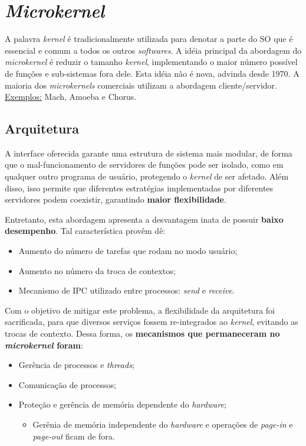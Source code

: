 \chapter{\textit{Microkernel}}
A palavra \textit{kernel} é tradicionalmente utilizada para denotar a parte do SO que é essencial e comum a todos os outros \textit{softwares}. A idéia principal da abordagem do \textit{microkernel} é reduzir o tamanho \textit{kernel}, implementando o maior número possível de funções e sub-sistemas fora dele. Esta idéia não é nova, advinda desde 1970. A maioria dos \textit{microkernels} comerciais utilizam a abordagem cliente/servidor. \underline{Exemplos:} Mach, Amoeba e Chorus.

\section{Arquitetura}
A interface oferecida garante uma estrutura de sistema mais modular, de forma que o mal-funcionamento de servidores de funções pode ser isolado, como em qualquer outro programa de usuário, protegendo o \textit{kernel} de ser afetado. Além disso, isso permite que diferentes estratégias implementadas por diferentes servidores podem coexistir, garantindo \textbf{maior flexibilidade}.

Entretanto, esta abordagem apresenta a desvantagem inata de possuir \textbf{baixo desempenho}. Tal característica provêm dê:
\begin{itemize}
  \item Aumento do número de tarefas que rodam no modo usuário;
  \item Aumento no número da troca de contextos;
  \item Mecanismo de IPC utilizado entre processos: \textit{send} e \textit{receive}.
\end{itemize}

Com o objetivo de mitigar este problema, a flexibilidade da arquitetura foi sacrificada, para que diversos serviços fossem re-integrados ao \textit{kernel}, evitando as trocas de contexto. Dessa forma, os \textbf{mecanismos que permaneceram no \textit{microkernel} foram}:
\begin{itemize}
  \item Gerência de processos e \textit{threads};
  \item Comunicação de processos;
  \item Proteção e gerência de memória dependente do \textit{hardware};
  \begin{itemize}
    \item Gerênia de memória independente do \textit{hardware} e operações de \textit{page-in} e \textit{page-out} ficam de fora.
  \end{itemize}
\end{itemize}


